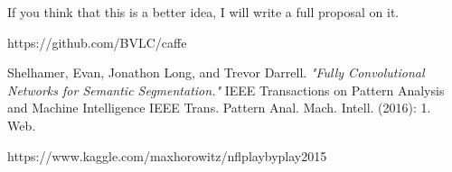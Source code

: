 \documentclass{article}
\begin{document}
If you think that this is a better idea, I will write a full proposal on it.
\begin{thebibliography}{9}
https://github.com/BVLC/caffe

Shelhamer, Evan, Jonathon Long, and Trevor Darrell. 
    \textit{"Fully Convolutional Networks for Semantic Segmentation."} IEEE Transactions on Pattern Analysis and Machine Intelligence IEEE Trans. Pattern Anal. Mach. Intell. (2016): 1. Web.

https://www.kaggle.com/maxhorowitz/nflplaybyplay2015
\end{thebibliography}
\end{document}

